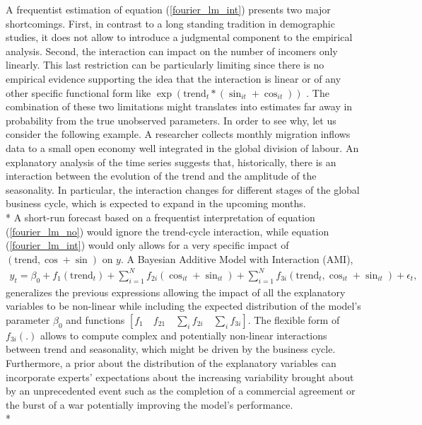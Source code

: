 \documentclass{article}\usepackage[]{graphicx}\usepackage[]{color}
\begin{document}
A frequentist estimation of equation (\ref{fourier_lm_int}) presents two major shortcomings. First, in contrast to a long standing tradition in demographic studies, it does not allow to introduce a judgmental component to the empirical analysis. Second, the interaction can impact on the number of incomers only linearly. This last restriction can be particularly limiting since there is no empirical evidence supporting the idea that the interaction is linear or of any other specific functional form like $ \exp(\text{trend}_{t}*(\sin_{it}+\cos_{it})) $ . The combination of these two limitations might translates into estimates far away in probability from the true unobserved parameters. In order to see why, let us consider the following example. A researcher collects monthly migration inflows data to a small open economy well integrated in the global division of labour. An explanatory analysis of the time series suggests that, historically, there is an interaction between the evolution of the trend and the amplitude of the seasonality. In particular, the interaction changes for different stages of the global business cycle, which is expected to expand in the upcoming months. \\*
A short-run forecast based on a frequentist interpretation of equation (\ref{fourier_lm_no}) would ignore the trend-cycle interaction, while equation (\ref{fourier_lm_int}) would only allows for a very specific impact of $ (\text{trend}, \cos + \sin) $ on $ y $. A Bayesian Additive Model with Interaction (AMI), 
\begin{align}\label{fourier_gam_int}
y_{t}=\beta_{0}+f_{1}(\text{trend}_{t})+\sum_{i=1}^{N}f_{2i}(\cos_{it}+\sin_{it})+\sum_{i=1}^{N}f_{3i}(\text{trend}_{t}, \cos_{it}+\sin_{it})+\epsilon_{t},
\end{align}
generalizes the previous expressions allowing the impact of all the explanatory variables to be non-linear while including the expected distribution of the model's parameter $\beta_{0}$ and functions $ [f_{1} \quad f_{21} \quad \sum_{i} f_{2i} \quad \sum_{i} f_{3i}] $. The flexible form of $f_{3i}(.)$ allows to compute complex and potentially non-linear interactions between trend and seasonality, which might be driven by the business cycle. Furthermore, a prior about the distribution of the explanatory variables can incorporate experts' expectations about the increasing variability brought about by an unprecedented event such as the completion of a commercial agreement or the burst of a war potentially improving the model's performance.\\*
\end{document}
